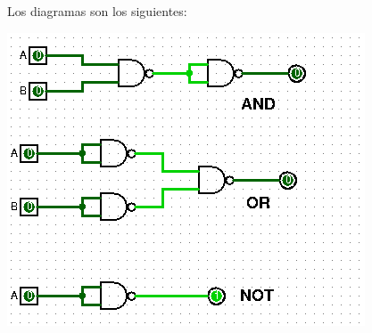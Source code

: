 \documentclass[answers]{exam}
\begin{document}
\begin{questions}
  \begin{solution}
    Los diagramas son los siguientes:
    \begin{center}
      \includegraphics[scale=0.8]{ejercicio2}
    \end{center}
  \end{solution}


\end{questions}
\end{document}
